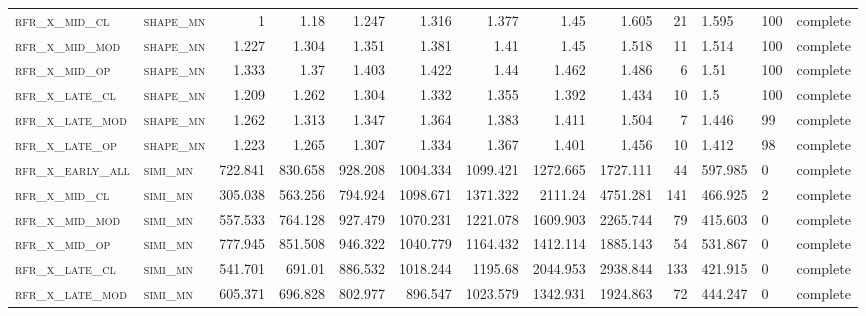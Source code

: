 \begin{landscape}
\begin{center}
\begin{footnotesize}
\begin{longtable}{llrrrrr|rrr}
\textsc{rfr\_x\_mid\_cl   } & \textsc{shape\_mn }   & 1       & 1.18    & 1.247   & 1.316    & 1.377    & 1.45     & 1.605    & 21     & 1.595         & 100           & complete        \\
\textsc{rfr\_x\_mid\_mod  } & \textsc{shape\_mn }   & 1.227   & 1.304   & 1.351   & 1.381    & 1.41     & 1.45     & 1.518    & 11     & 1.514         & 100           & complete        \\
\textsc{rfr\_x\_mid\_op   } & \textsc{shape\_mn }   & 1.333   & 1.37    & 1.403   & 1.422    & 1.44     & 1.462    & 1.486    & 6      & 1.51          & 100           & complete        \\
\textsc{rfr\_x\_late\_cl  } & \textsc{shape\_mn }   & 1.209   & 1.262   & 1.304   & 1.332    & 1.355    & 1.392    & 1.434    & 10     & 1.5           & 100           & complete        \\
\textsc{rfr\_x\_late\_mod } & \textsc{shape\_mn }   & 1.262   & 1.313   & 1.347   & 1.364    & 1.383    & 1.411    & 1.504    & 7      & 1.446         & 99            & complete        \\
\textsc{rfr\_x\_late\_op  } & \textsc{shape\_mn }   & 1.223   & 1.265   & 1.307   & 1.334    & 1.367    & 1.401    & 1.456    & 10     & 1.412         & 98            & complete        \\
\textsc{rfr\_x\_early\_all} & \textsc{simi\_mn  }   & 722.841 & 830.658 & 928.208 & 1004.334 & 1099.421 & 1272.665 & 1727.111 & 44     & 597.985       & 0             & complete            \\
\textsc{rfr\_x\_mid\_cl   } & \textsc{simi\_mn  }   & 305.038 & 563.256 & 794.924 & 1098.671 & 1371.322 & 2111.24  & 4751.281 & 141    & 466.925       & 2             & complete        \\
\textsc{rfr\_x\_mid\_mod  } & \textsc{simi\_mn  }   & 557.533 & 764.128 & 927.479 & 1070.231 & 1221.078 & 1609.903 & 2265.744 & 79     & 415.603       & 0             & complete            \\
\textsc{rfr\_x\_mid\_op   } & \textsc{simi\_mn  }   & 777.945 & 851.508 & 946.322 & 1040.779 & 1164.432 & 1412.114 & 1885.143 & 54     & 531.867       & 0             & complete            \\
\textsc{rfr\_x\_late\_cl  } & \textsc{simi\_mn  }   & 541.701 & 691.01  & 886.532 & 1018.244 & 1195.68  & 2044.953 & 2938.844 & 133    & 421.915       & 0             & complete            \\
\textsc{rfr\_x\_late\_mod } & \textsc{simi\_mn  }   & 605.371 & 696.828 & 802.977 & 896.547  & 1023.579 & 1342.931 & 1924.863 & 72     & 444.247       & 0             & complete            \\

\end{longtable}
\end{footnotesize}
\end{center}
\end{landscape}
